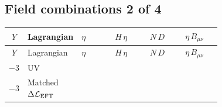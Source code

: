 \documentclass[8pt]{article}
\begin{document}
\begin{landscape}
\subsection*{Field combinations 2 of 4}
\begin{longtable}{@{}c l >{\raggedright\arraybackslash}p{0.18\linewidth} >{\raggedright\arraybackslash}p{0.18\linewidth} >{\raggedright\arraybackslash}p{0.18\linewidth} >{\raggedright\arraybackslash}p{0.18\linewidth}@{}}
\toprule
$Y$ & Lagrangian & $\eta$ & $H\,\eta$ & $N\,D$ & $\eta\,B_{\mu\nu}$ \\
\midrule
\endfirsthead
\toprule
$Y$ & Lagrangian & $\eta$ & $H\,\eta$ & $N\,D$ & $\eta\,B_{\mu\nu}$ \\
\midrule
\endhead
$-3$ & UV & \scriptsize\adjustbox{max width=\linewidth}{$\begin{gathered} +\frac{1}{2} \lambda _S \eta _{a_1} \eta _{a_2} \eta _{a_1}{}^{\dagger } \eta _{a_2}{}^{\dagger } \\ +M_{\eta }^2 \left(-\eta _{a_1}\right) \eta _{a_1}{}^{\dagger }\end{gathered}$} & \scriptsize\adjustbox{max width=\linewidth}{$\begin{gathered} +\lambda _3 H_{a_1} \eta _{a_2} H_{a_1}{}^{\dagger } \eta _{a_2}{}^{\dagger } \\ +\lambda _4 \eta _{a_1} H_{a_2} H_{a_1}{}^{\dagger } \eta _{a_2}{}^{\dagger }\end{gathered}$} & \scriptsize\adjustbox{max width=\linewidth}{$\begin{gathered} \frac{1}{2} i N_{r_1}{}^T\, C\, \gamma ^{\mu _1}\, D_{\mu _1}\left(N_{r_1}\right)\end{gathered}$} &  \\
\midrule
$-3$ & Matched $\Delta\mathcal{L}_{\rm EFT}$ &  & \scriptsize\adjustbox{max width=\linewidth}{$\begin{gathered} \lambda _3^2 \hbar  H_{a_1} H_{a_2} \log \left(\frac{\text{$\mu $bar2}}{M_{\eta }^2}\right) H_{a_1}{}^{\dagger } H_{a_2}{}^{\dagger } \\ +\frac{1}{2} \lambda _4^2 \hbar  H_{a_1} H_{a_2} \log \left(\frac{\text{$\mu $bar2}}{M_{\eta }^2}\right) H_{a_1}{}^{\dagger } H_{a_2}{}^{\dagger } \\ +\lambda _3 \lambda _4 \hbar  H_{a_1} H_{a_2} \log \left(\frac{\text{$\mu $bar2}}{M_{\eta }^2}\right) H_{a_1}{}^{\dagger } H_{a_2}{}^{\dagger }\end{gathered}$} &  & \scriptsize\adjustbox{max width=\linewidth}{$\begin{gathered} -\frac{3}{2} \hbar  \log \left(\frac{\text{$\mu $bar2}}{M_{\eta }^2}\right) B_{\mu _1\mu _2}^2\end{gathered}$} \\

\end{longtable}
\end{landscape}
\end{document}
